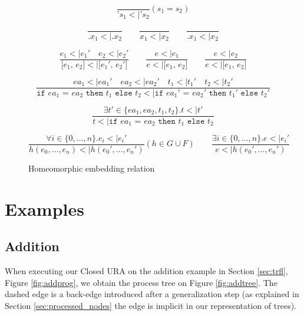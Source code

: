\documentclass[10pt]{../sigplanconf}
\newcommand{\nfrac}[2]{\frac{\displaystyle{#1}}{\displaystyle{#2}}}
\newcommand{\tagsc}[1]{\tag{\scshape #1}}
\begin{document}
\begin{figure*}\centering
  \begin{equation}
    \nfrac{
    }{
      \texttt{'}s_1 <| \texttt{'}s_2
    } (s_1 = s_2) \tagsc{Atoms}
  \end{equation}

  \begin{equation}
    \nfrac{
    }{
      \texttt{.}x_1 <| \texttt{.}x_2
    }
    \qquad
    \nfrac{
    }{
      x_1 <| x_2
    }
    \qquad
    \nfrac{
    }{
      \texttt{.}x_1 <| x_2
    } \tagsc{Variables}
  \end{equation}

  \begin{equation}
    \nfrac{
      e_1 <| e_1'\quad e_2 <| e_2'
    }{
      \texttt{[$e_1$, $e_2$]} <| \texttt{[$e_1'$, $e_2'$]}
    }
    \qquad
    \nfrac{
      e <| e_1
    }{
      e <| \texttt{[$e_1$, $e_2$]}
    }
    \qquad
    \nfrac{
      e <| e_2
    }{
      e <| \texttt{[$e_1$, $e_2$]}
    }
    \tagsc{Cons}
  \end{equation}

  \begin{equation}
    \nfrac{
      ea_1 <| ea_1' \quad ea_2 <| ea_2' \quad t_1 <| t_1' \quad t_2 <| t_2'
    }{
      \texttt{if $ea_1$ = $ea_2$ then $t_1$ else $t_2$} <| \texttt{if $ea_1'$ = $ea_2'$ then $t_1'$ else $t_2'$}
    } \tagsc{If-A}
  \end{equation}

  \begin{equation}
    \nfrac{
      \exists t' \in \{ea_1, ea_2, t_1, t_2\}. t <| t'
    }{
      t <| \texttt{if $ea_1$ = $ea_2$ then $t_1$ else $t_2$}
    } \tagsc{If-B}
  \end{equation}

\begin{equation}
  \nfrac{
    \forall i \in \{0, \ldots, n\}. e_i <| e_i'
  }{
    h(e_0, \ldots, e_n) <| h(e_0', \ldots, e_n')
  } (h \in G \cup F)
  \qquad
  \nfrac{
    \exists i \in \{0, \ldots, n\}. e <| e_i'
  }{
    e <| h(e_0', \ldots, e_n')
  }
 \tagsc{Call}
\end{equation}

\caption{Homeomorphic embedding relation}
\label{fig:embedding}
\end{figure*}

\section{Examples}
\subsection{Addition}
When executing our Closed URA on the addition example in Section
\ref{sec:trfl}, Figure \ref{fig:addprog}, we obtain the process tree
on Figure \ref{fig:addtree}. The dashed edge is a back-edge introduced
after a generalization step (as explained in Section
\ref{sec:processed_nodes} the edge is implicit in our representation
of trees).
\end{document}
